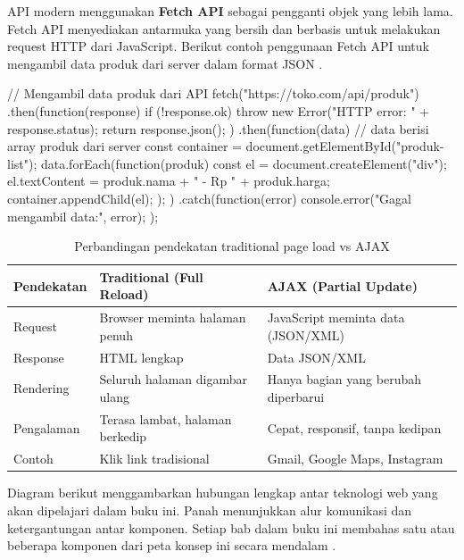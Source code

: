 API modern menggunakan \textbf{Fetch API} sebagai pengganti objek  yang lebih lama. Fetch API menyediakan antarmuka yang bersih dan berbasis  untuk melakukan request HTTP dari JavaScript. Berikut contoh penggunaan Fetch API untuk mengambil data produk dari server dalam format JSON \cite{mdnJsGuide}.

\begin{webcode}[language=JavaScript, caption={Contoh Fetch API: mengambil data produk dari server}]
// Mengambil data produk dari API
fetch("https://toko.com/api/produk")
  .then(function(response) {
    if (!response.ok) {
      throw new Error("HTTP error: " + response.status);
    }
    return response.json();
  })
  .then(function(data) {
    // data berisi array produk dari server
    const container = document.getElementById("produk-list");
    data.forEach(function(produk) {
      const el = document.createElement("div");
      el.textContent = produk.nama + " - Rp " + produk.harga;
      container.appendChild(el);
    });
  })
  .catch(function(error) {
    console.error("Gagal mengambil data:", error);
  });
\end{webcode}

\begin{table}[H]
\centering
\begin{tabular}{|P{3cm}|P{4cm}|P{4.5cm}|}
\hline
\textbf{Pendekatan} & \textbf{Traditional (Full Reload)} & \textbf{AJAX (Partial Update)} \\
\hline
Request & Browser meminta halaman penuh & JavaScript meminta data (JSON/XML) \\
\hline
Response & HTML lengkap & Data JSON/XML \\
\hline
Rendering & Seluruh halaman digambar ulang & Hanya bagian yang berubah diperbarui \\
\hline
Pengalaman & Terasa lambat, halaman berkedip & Cepat, responsif, tanpa kedipan \\
\hline
Contoh & Klik link tradisional & Gmail, Google Maps, Instagram \\
\hline
\end{tabular}
\caption{Perbandingan pendekatan traditional page load vs AJAX}
\end{table}

Diagram berikut menggambarkan hubungan lengkap antar teknologi web yang akan dipelajari dalam buku ini. Panah menunjukkan alur komunikasi dan ketergantungan antar komponen. Setiap bab dalam buku ini membahas satu atau beberapa komponen dari peta konsep ini secara mendalam \cite{webdevLearn}.

